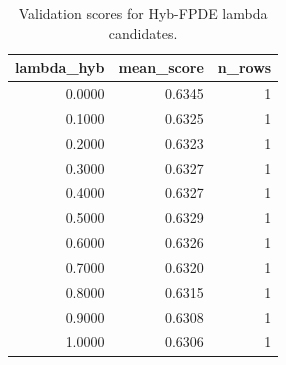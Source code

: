 \begin{table}[t]
\caption{Validation scores for Hyb-FPDE lambda candidates.}
\label{tab:lambda_distribution_computed}
\centering
\begin{tabular}{rrr}
\toprule
lambda\_hyb & mean\_score & n\_rows \\
\midrule
0.0000 & 0.6345 & 1 \\
0.1000 & 0.6325 & 1 \\
0.2000 & 0.6323 & 1 \\
0.3000 & 0.6327 & 1 \\
0.4000 & 0.6327 & 1 \\
0.5000 & 0.6329 & 1 \\
0.6000 & 0.6326 & 1 \\
0.7000 & 0.6320 & 1 \\
0.8000 & 0.6315 & 1 \\
0.9000 & 0.6308 & 1 \\
1.0000 & 0.6306 & 1 \\
\bottomrule
\end{tabular}

\end{table}
